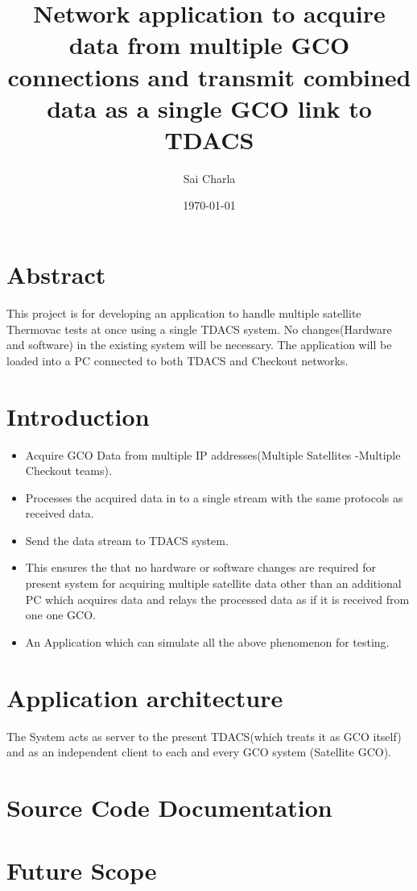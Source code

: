 \documentclass[12pt, a4paper]{report}
\title{Network application to acquire data from multiple GCO connections and
	   transmit combined data as a single GCO link to TDACS}
\author{Sai Charla}
\date{\today}
\begin{document}
\maketitle
\tableofcontents

\chapter*{Abstract}
\par This project is for developing an application to handle multiple satellite
Thermovac tests at once using a single TDACS system. No changes(Hardware and
software) in the existing system will be necessary. The application will be
loaded into a PC connected to both TDACS and Checkout networks.

\chapter{Introduction}
	\begin{itemize}
			\item Acquire GCO Data from multiple IP addresses(Multiple Satellites
					-Multiple Checkout teams).
			\item Processes the acquired data in to a single stream with the same
					protocols as received data.
			\item Send the data stream to TDACS system.
			\item This ensures the that no hardware or software changes are required
					for present system for acquiring multiple satellite data other than an
					additional PC which acquires data and relays the processed data as if it
					is received from one one GCO.
			\item An Application which can simulate all the above phenomenon for
					testing.
	\end{itemize}

\chapter{Application architecture}
The System acts as server to the present TDACS(which treats it as GCO itself)
and as an independent client to each and every GCO system (Satellite GCO).

\chapter{Source Code Documentation}

\chapter{Future Scope}
\end{document}
